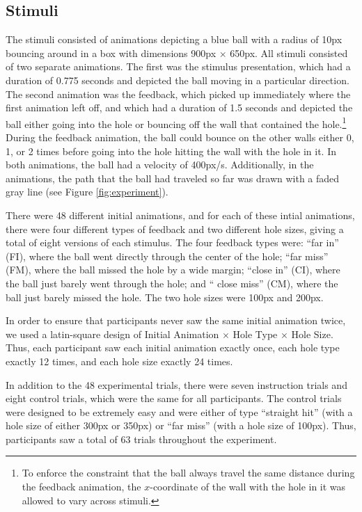 \documentclass[10pt,letterpaper]{article}
\begin{document}
\subsection{Stimuli}

The stimuli consisted of animations depicting a blue ball with a radius of 10px bouncing around in a box with dimensions 900px $\times$ 650px. All stimuli consisted of two separate animations. The first was the stimulus presentation, which had a duration of 0.775 seconds and depicted the ball moving in a particular direction. The second animation was the feedback, which picked up immediately where the first animation left off, and which had a duration of 1.5 seconds and depicted the ball either going into the hole or bouncing off the wall that contained the hole.\footnote{To enforce the constraint that the ball always travel the same distance during the feedback animation, the $x$-coordinate of the wall with the hole in it was allowed to vary across stimuli.} During the feedback animation, the ball could bounce on the other walls either 0, 1, or 2 times before going into the hole hitting the wall with the hole in it. In both animations, the ball had a velocity of 400px/s. Additionally, in the animations, the path that the ball had traveled so far was drawn with a faded gray line (see Figure \ref{fig:experiment}).

There were 48 different initial animations, and for each of these intial animations, there were four different types of feedback and two different hole sizes, giving a total of eight versions of each stimulus. The four feedback types were: ``far in'' (FI), where the ball went directly through the center of the hole; ``far miss'' (FM), where the ball missed the hole by a wide margin; ``close in'' (CI), where the ball just barely went through the hole; and `` close miss'' (CM), where the ball just barely missed the hole. The two hole sizes were 100px and 200px.

In order to ensure that participants never saw the same initial animation twice, we used a latin-square design of Initial Animation $\times$ Hole Type $\times$ Hole Size. Thus, each participant saw each initial animation exactly once, each hole type exactly 12 times, and each hole size exactly 24 times.

In addition to the 48 experimental trials, there were seven instruction trials and eight control trials, which were the same for all participants. The control trials were designed to be extremely easy and were either of type ``straight hit'' (with a hole size of either 300px or 350px) or ``far miss'' (with a hole size of 100px). Thus, participants saw a total of 63 trials throughout the experiment.
\end{document}
